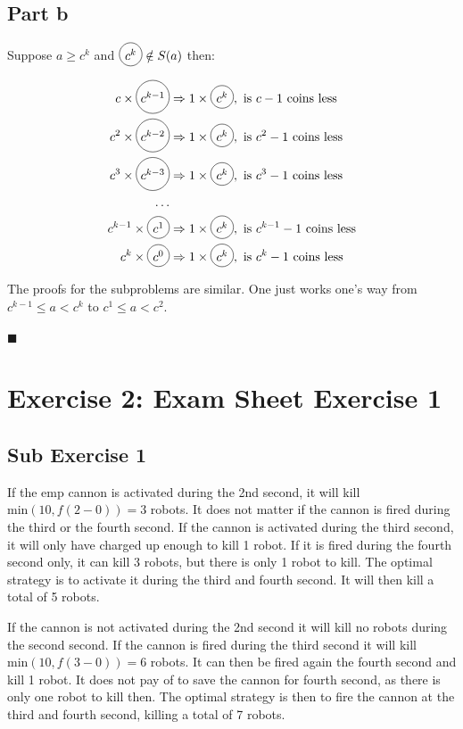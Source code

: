 \documentclass[koma,a4paper]{article}
\newcommand*\circled[1]{\tikz[baseline=(char.base)]{\node[shape=circle,draw,inner sep=2pt] (char) {#1};}} %
\begin{document}
\subsection{Part b}
Suppose $a \geq c^k$ and $\circled{$c^k$} \notin S(a)$ then:

\begin{align*}
  c \times \circled{$c^{k-1}$} &\Rightarrow 1 \times \circled{$c^k$}, \text{ is } c - 1 \text{ coins less}\\
  c^2 \times \circled{$c^{k-2}$} &\Rightarrow 1 \times \circled{$c^k$}, \text{ is } c^2 - 1 \text{ coins less}\\
  c^3 \times \circled{$c^{k-3}$} &\Rightarrow 1 \times \circled{$c^k$}, \text{ is } c^3 - 1 \text{ coins less}\\
  \dots\\
  c^{k-1} \times \circled{$c^1$} &\Rightarrow 1 \times \circled{$c^k$}, \text{ is } c^{k-1} - 1 \text{ coins less}\\
  c^k \times \circled{$c^0$} &\Rightarrow 1 \times \circled{$c^k$}, \text{ is } c^k - 1 \text{ coins less}\\
\end{align*}

The proofs for the subproblems are similar. One just works one's way from $c^{k-1} \leq a < c^k$ to $c^1 \leq a < c^2$.

\hfill\ensuremath{\blacksquare}

\section{Exercise 2: Exam Sheet Exercise 1}
\subsection{Sub Exercise 1}
If the emp cannon is activated during the 2nd second, it will kill $\text{min}(10, f(2 - 0)) = 3$ robots. It does not matter if the cannon is fired during the third or the fourth second. If the cannon is activated during the third second, it will only have charged up enough to kill 1 robot. If it is fired during the fourth second only, it can kill 3 robots, but there is only 1 robot to kill. The optimal strategy is to activate it during the third and fourth second. It will then kill a total of 5 robots.

If the cannon is not activated during the 2nd second it will kill no robots during the second second. If the cannon is fired during the third second it will kill $\text{min}(10, f(3 - 0)) = 6$ robots. It can then be fired again the fourth second and kill 1 robot. It does not pay of to save the cannon for fourth second, as there is only one robot to kill then. The optimal strategy is then to fire the cannon at the third and fourth second, killing a total of 7 robots.
\end{document}
